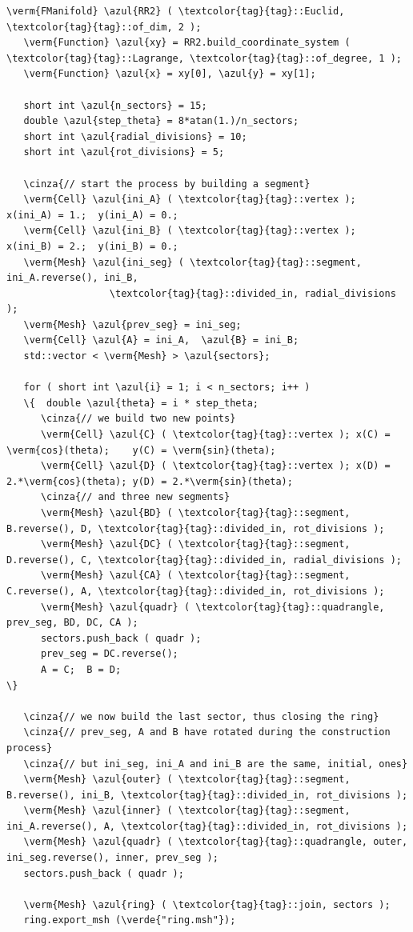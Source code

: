 \begin{Verbatim}[commandchars=\\\{\},formatcom=\small\tt,frame=single,
   label=parag-\ref{\numb section 9.\numb parag 2}.cpp,rulecolor=\color{coment},
   baselinestretch=0.94,framesep=2mm                                            ]
   \verm{FManifold} \azul{RR2} ( \textcolor{tag}{tag}::Euclid, \textcolor{tag}{tag}::of_dim, 2 );
   \verm{Function} \azul{xy} = RR2.build_coordinate_system ( \textcolor{tag}{tag}::Lagrange, \textcolor{tag}{tag}::of_degree, 1 );
   \verm{Function} \azul{x} = xy[0], \azul{y} = xy[1];

   short int \azul{n_sectors} = 15;
   double \azul{step_theta} = 8*atan(1.)/n_sectors;
   short int \azul{radial_divisions} = 10;
   short int \azul{rot_divisions} = 5;

   \cinza{// start the process by building a segment}
   \verm{Cell} \azul{ini_A} ( \textcolor{tag}{tag}::vertex );  x(ini_A) = 1.;  y(ini_A) = 0.;
   \verm{Cell} \azul{ini_B} ( \textcolor{tag}{tag}::vertex );  x(ini_B) = 2.;  y(ini_B) = 0.;
   \verm{Mesh} \azul{ini_seg} ( \textcolor{tag}{tag}::segment, ini_A.reverse(), ini_B,
                  \textcolor{tag}{tag}::divided_in, radial_divisions     );
   \verm{Mesh} \azul{prev_seg} = ini_seg;
   \verm{Cell} \azul{A} = ini_A,  \azul{B} = ini_B;
   std::vector < \verm{Mesh} > \azul{sectors};

   for ( short int \azul{i} = 1; i < n_sectors; i++ )
   \{  double \azul{theta} = i * step_theta;
      \cinza{// we build two new points}
      \verm{Cell} \azul{C} ( \textcolor{tag}{tag}::vertex ); x(C) = \verm{cos}(theta);    y(C) = \verm{sin}(theta);
      \verm{Cell} \azul{D} ( \textcolor{tag}{tag}::vertex ); x(D) = 2.*\verm{cos}(theta); y(D) = 2.*\verm{sin}(theta);
      \cinza{// and three new segments}
      \verm{Mesh} \azul{BD} ( \textcolor{tag}{tag}::segment, B.reverse(), D, \textcolor{tag}{tag}::divided_in, rot_divisions );
      \verm{Mesh} \azul{DC} ( \textcolor{tag}{tag}::segment, D.reverse(), C, \textcolor{tag}{tag}::divided_in, radial_divisions );
      \verm{Mesh} \azul{CA} ( \textcolor{tag}{tag}::segment, C.reverse(), A, \textcolor{tag}{tag}::divided_in, rot_divisions );
      \verm{Mesh} \azul{quadr} ( \textcolor{tag}{tag}::quadrangle, prev_seg, BD, DC, CA );
      sectors.push_back ( quadr );
      prev_seg = DC.reverse();
      A = C;  B = D;                                                             \}

   \cinza{// we now build the last sector, thus closing the ring}
   \cinza{// prev_seg, A and B have rotated during the construction process}
   \cinza{// but ini_seg, ini_A and ini_B are the same, initial, ones}
   \verm{Mesh} \azul{outer} ( \textcolor{tag}{tag}::segment, B.reverse(), ini_B, \textcolor{tag}{tag}::divided_in, rot_divisions );
   \verm{Mesh} \azul{inner} ( \textcolor{tag}{tag}::segment, ini_A.reverse(), A, \textcolor{tag}{tag}::divided_in, rot_divisions );
   \verm{Mesh} \azul{quadr} ( \textcolor{tag}{tag}::quadrangle, outer, ini_seg.reverse(), inner, prev_seg );
   sectors.push_back ( quadr );
   
   \verm{Mesh} \azul{ring} ( \textcolor{tag}{tag}::join, sectors );
   ring.export_msh (\verde{"ring.msh"});
\end{Verbatim}


